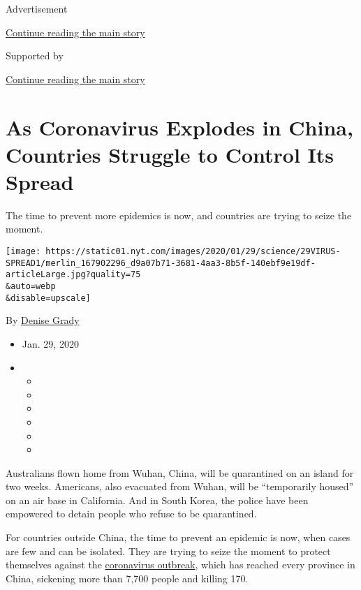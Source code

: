 Advertisement

\protect\hyperlink{after-top}{Continue reading the main story}

Supported by

\protect\hyperlink{after-sponsor}{Continue reading the main story}

\hypertarget{as-coronavirus-explodes-in-china-countries-struggle-to-control-its-spread}{%
\section{As Coronavirus Explodes in China, Countries Struggle to Control
Its
Spread}\label{as-coronavirus-explodes-in-china-countries-struggle-to-control-its-spread}}

The time to prevent more epidemics is now, and countries are trying to
seize the moment.

\texttt{[image: https://static01.nyt.com/images/2020/01/29/science/29VIRUS-SPREAD1/merlin\_167902296\_d9a07b71-3681-4aa3-8b5f-140ebf9e19df-articleLarge.jpg?quality=75\\\&auto=webp\\\&disable=upscale]}

By \href{https://www.nytimes.com/by/denise-grady}{Denise Grady}

\begin{itemize}
\item
  Jan. 29, 2020
\item
  \begin{itemize}
  \item
  \item
  \item
  \item
  \item
  \item
  \end{itemize}
\end{itemize}

Australians flown home from Wuhan, China, will be quarantined on an
island for two weeks. Americans, also evacuated from Wuhan, will be
``temporarily housed'' on an air base in California. And in South Korea,
the police have been empowered to detain people who refuse to be
quarantined.

For countries outside China, the time to prevent an epidemic is now,
when cases are few and can be isolated. They are trying to seize the
moment to protect themselves against the
\href{https://www.nytimes.com/2020/01/30/podcasts/the-daily/coronavirus.html}{coronavirus
outbreak}, which has reached every province in China, sickening more
than 7,700 people and killing 170.

